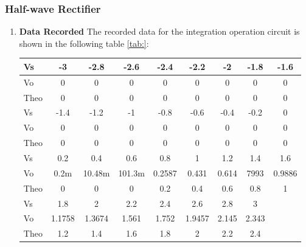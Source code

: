     \subsubsection{Half-wave Rectifier}
    \begin{enumerate}[I]
        \item \textbf{Data Recorded}\newline
            The recorded data for the integration operation circuit is shown in the following table \ref{tab:}:
            \begin{table}[h]
                \centering
                \begin{tabular}{l|cccccccc}
                    \hline
                    \toprule
                    Vs   & -3     & -2.8   & -2.6   & -2.4   & -2.2   & -2    & -1.8  & -1.6   \\
                    \midrule
                    Vo   & 0      & 0      & 0      & 0      & 0      & 0     & 0     & 0      \\
                    Theo & 0      & 0      & 0      & 0      & 0      & 0     & 0     & 0      \\
                    \midrule
                    \midrule
                    Vs   & -1.4   & -1.2   & -1     & -0.8   & -0.6   & -0.4  & -0.2  & 0      \\
                    \midrule
                    Vo   & 0      & 0      & 0      & 0      & 0      & 0     & 0     & 0      \\
                    Theo & 0      & 0      & 0      & 0      & 0      & 0     & 0     & 0      \\
                    \midrule
                    \midrule
                    Vs   & 0.2    & 0.4    & 0.6    & 0.8    & 1      & 1.2   & 1.4   & 1.6    \\
                    \midrule
                    Vo   & 0.2m   & 10.48m & 101.3m & 0.2587 & 0.431  & 0.614 & 7993  & 0.9886 \\
                    Theo & 0      & 0      & 0      & 0.2    & 0.4    & 0.6   & 0.8   & 1      \\
                    \midrule
                    \midrule
                    Vs   & 1.8    & 2      & 2.2    & 2.4    & 2.6    & 2.8   & 3     &        \\
                    \midrule
                    Vo   & 1.1758 & 1.3674 & 1.561  & 1.752  & 1.9457 & 2.145 & 2.343 &        \\
                    Theo & 1.2    & 1.4    & 1.6    & 1.8    & 2      & 2.2   & 2.4   &        \\

\end{tabular}
\end{table}
\end{enumerate}

